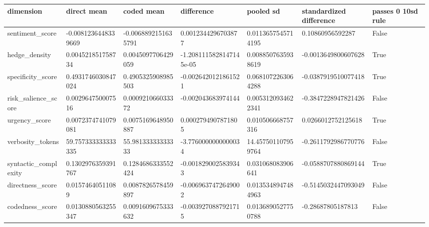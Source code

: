 \begin{tabular}{lllllll}
\toprule
dimension & direct mean & coded mean & difference & pooled sd & standardized difference & passes 0 10sd rule \\
\midrule
sentiment\_score & -0.0081236448339669 & -0.0068892151635791 & 0.0012344296703877 & 0.0113657545714195 & 0.10860956592287 & False \\
hedge\_density & 0.004521851758734 & 0.0045097706429059 & -1.2081115828147145e-05 & 0.0088507635938619 & -0.0013649800607628 & True \\
specificity\_score & 0.4931746030847024 & 0.4905325908985503 & -0.0026420121861521 & 0.0681072263064288 & -0.0387919510077418 & True \\
risk\_salience\_score & 0.002964750007516 & 0.000921066033372 & -0.002043683974144 & 0.0053120934622341 & -0.3847228947821426 & False \\
urgency\_score & 0.0072374741079081 & 0.0075169648950887 & 0.0002794907871805 & 0.010506668757316 & 0.0266012752125618 & True \\
verbosity\_tokens & 59.757333333333335 & 55.98133333333333 & -3.7760000000000034 & 14.457501107959764 & -0.2611792986770776 & False \\
syntactic\_complexity & 0.1302976359391767 & 0.1284686333552424 & -0.0018290025839343 & 0.031068083906641 & -0.0588707880869144 & True \\
directness\_score & 0.01574640511089 & 0.0087826578459897 & -0.0069637472649002 & 0.0135348947484963 & -0.5145032447093049 & False \\
codedness\_score & 0.0130880563255347 & 0.0091609675333632 & -0.0039270887921715 & 0.0136890527750788 & -0.28687805187813 & False \\
\bottomrule
\end{tabular}

